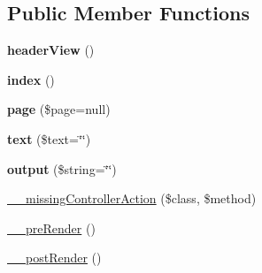 \subsection*{Public Member Functions}
\begin{DoxyCompactItemize}
\item 
\hypertarget{class_generic_page_controller_ac6d592a47df3f54da5bd899ff3ada3e9}{
{\bfseries headerView} ()}
\label{class_generic_page_controller_ac6d592a47df3f54da5bd899ff3ada3e9}

\item 
\hypertarget{class_generic_page_controller_a149eb92716c1084a935e04a8d95f7347}{
{\bfseries index} ()}
\label{class_generic_page_controller_a149eb92716c1084a935e04a8d95f7347}

\item 
\hypertarget{class_generic_page_controller_a164fce86afb5b2dfb3e62efc0461fd89}{
{\bfseries page} (\$page=null)}
\label{class_generic_page_controller_a164fce86afb5b2dfb3e62efc0461fd89}

\item 
\hypertarget{class_generic_page_controller_a14c153b70c64ec401186d28e6f4770bc}{
{\bfseries text} (\$text=\char`\"{}\char`\"{})}
\label{class_generic_page_controller_a14c153b70c64ec401186d28e6f4770bc}

\item 
\hypertarget{class_generic_page_controller_a14d87d76017cfc33727fbab85204f5a1}{
{\bfseries output} (\$string=\char`\"{}\char`\"{})}
\label{class_generic_page_controller_a14d87d76017cfc33727fbab85204f5a1}

\item 
\hyperlink{class_controller_a728c573e418d1f979340a4669524cacd}{\_\-\_\-missingControllerAction} (\$class, \$method)
\item 
\hyperlink{class_controller_ad86994d2463ea27cab892176e6509bdb}{\_\-\_\-preRender} ()
\item 
\hyperlink{class_controller_adc3c9cc4788f7ba7d1368fdc43568b1d}{\_\-\_\-postRender} ()
\end{DoxyCompactItemize}

